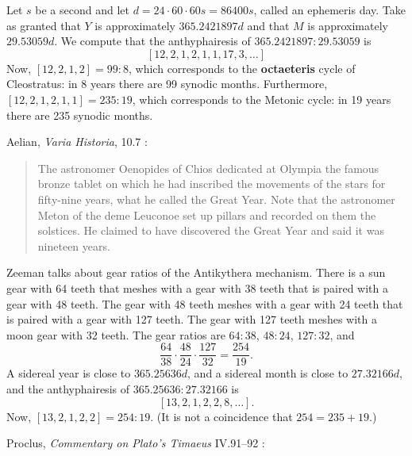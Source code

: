 \documentclass{article}
\begin{document}
Let $s$ be a second and
let $d=24 \cdot 60 \cdot 60 s =  86400s$, called an ephemeris day. 
Take as granted that $Y$ is approximately $365.2421897d$ and that $M$ is approximately
$29.53059d$. We compute that the anthyphairesis of $365.2421897:29.53059$ is
\[
[12,2,1,2,1,1,17,3,\ldots]
\]
Now, $[12,2,1,2] =99:8$,
which corresponds to the \textbf{octaeteris} cycle of Cleostratus: in $8$ years there are 99 synodic months.
Furthermore, $[12,2,1,2,1,1] = 235:19$, which corresponds to the Metonic cycle: in 19 years there
are 235 synodic months.  

Aelian, {\em Varia Historia}, 10.7 \cite[p.~319]{aelian}:

\begin{quote}
The astronomer Oenopides of Chios dedicated at Olympia
the famous bronze tablet on which he had inscribed the movements
of the stars for fifty-nine years, what he called the Great Year.
Note that the astronomer Meton of the deme Leuconoe set up
pillars and recorded on them the solstices. He claimed to have discovered
the Great Year and said it was nineteen years.
\end{quote}


Zeeman \cite{zeeman} talks about gear ratios of
the Antikythera mechanism. There is a sun gear with 64 teeth that meshes with a gear
with 38 teeth that is paired with a gear with 48 teeth. The gear with 48 teeth meshes with a gear with
24 teeth that is paired with a gear with 127 teeth. The gear with 127 teeth meshes with a moon gear
with 32 teeth. The gear ratios are 
$64:38$, $48:24$, $127:32$, and 
\[
\frac{64}{38} \cdot \frac{48}{24} \cdot \frac{127}{32} = \frac{254}{19}.
\]
A sidereal year is close to $365.25636d$, and a sidereal month is close to $27.32166d$,
and the anthyphairesis of $365.25636:27.32166$ is
\[
[13,2,1,2,2,8,\ldots].
\]
Now, $[13,2,1,2,2] = 254:19$. 
(It is not a coincidence that $254=235+19$.)

Proclus, {\em Commentary on Plato's Timaeus} IV.91--92 \cite[pp.~169--170]{timaeum4}:
\end{document}
